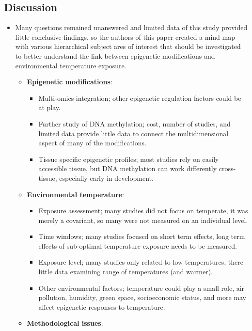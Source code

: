 \documentclass[plain, basic]{inVerba-notes}
\begin{document}
\begin{itemize}
\subsection{Discussion}
\begin{itemize}
    \item Many questions remained unanswered and limited data of this study provided little conclusive findings, so the authors of this paper created a mind map with various hierarchical subject ares of interest that should be investigated to better understand the link between epigenetic modifications and environmental temperature exposure.
      \begin{itemize}
        \item \textbf{Epigenetic modifications}:
          \begin{itemize}
            \item Multi-omics integration; other epigenetic regulation factors could be at play.
            \item Further study of DNA methylation; cost, number of studies, and limited data provide little data to connect the multidimensional aspect of many of the modifications.
            \item Tissue specific epigenetic profiles; most studies rely on easily accessible tissue, but DNA methylation can work differently cross-tissue, especially early in development. 
          \end{itemize}
        \item \textbf{Environmental temperature}:
          \begin{itemize}
            \item Exposure assessment; many studies did not focus on temperate, it was merely a covariant, so many were not measured on an individual level.
            \item Time windows; many studies focused on short term effects, long term effects of sub-optimal temperature exposure needs to be measured.
            \item Exposure level; many studies only related to low temperatures, there little data examining range of temperatures (and warmer).
            \item Other environmental factors; temperature could play a small role, air pollution, humidity, green space, socioeconomic status, and more may affect epigenetic responses to temperature.
          \end{itemize}
        \item \textbf{Methodological issues}:

\end{itemize}
\end{itemize}
\end{itemize}
\end{document}
